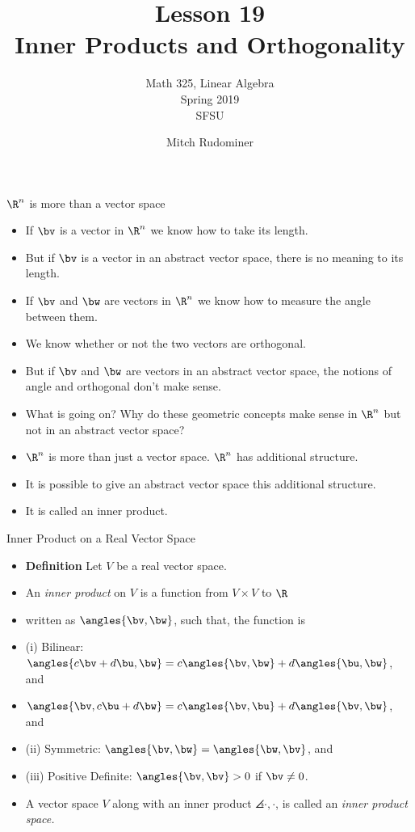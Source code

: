 \documentclass{beamer}
\title{Lesson 19 \\ Inner Products and Orthogonality}
\subtitle{Math 325, Linear Algebra \\ Spring 2019 \\ SFSU}
\author{Mitch Rudominer}
\date{}
\begin{document}
\begin{frame}
  \titlepage
\end{frame}


\begin{frame}{$\R^n$ is more than a vector space}

\begin{itemize}
\item If $\bv$ is a vector in $\R^n$ we know how to take its length.
\item But if $\bv$ is a vector in an abstract vector space, there is no meaning to its length.
\item If $\bv$ and $\bw$ are vectors in $\R^n$ we know how to measure the angle between them.
\item We know whether or not the two vectors are orthogonal.
\item But if $\bv$ and $\bw$ are vectors in an abstract vector space, the notions of angle and orthogonal don't make sense.
\item What is going on? Why do these geometric concepts make sense in $\R^n$ but not in an abstract vector space?
\item $\R^n$ is more than just a vector space. $\R^n$ has additional structure.
\item It is possible to give an abstract vector space this additional structure.
\item It is called an inner product.
\end{itemize}
\end{frame}


\begin{frame}{Inner Product on a Real Vector Space}

\begin{itemize}
\item \textbf{Definition} Let $V$ be a real vector space.
\item An \emph{inner product} on $V$ is a function from $V\times V$ to $\R$
\item written as $\angles{\bv,\bw}$, such that, the function is
\item (i) Bilinear: $\angles{c\bv+d\bu,\bw} = c\angles{\bv,\bw} + d\angles{\bu,\bw}$, and
\item $\angles{\bv,c\bu + d\bw} = c\angles{\bv,\bu} + d\angles{\bv,\bw}$, and
\item (ii) Symmetric: $\angles{\bv,\bw}=\angles{\bw,\bv}$, and
\item (iii) Positive Definite: $\angles{\bv,\bv} > 0$ if $\bv\not=0$.
\item A vector space $V$ along with an inner product $\angles{\cdot, \cdot}$, is
called an \emph{inner product space.}
\end{itemize}
\end{frame}
\end{document}
